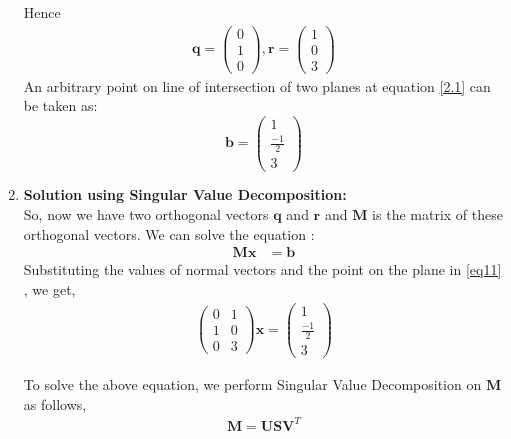 \documentclass[journal,12pt,twocolumn]{IEEEtran}
\let\vec\mathbf
\numberwithin{equation}{subsection}
\newcommand{\myvec}[1]{\ensuremath{\begin{pmatrix}#1\end{pmatrix}}}
\begin{document}
\begin{enumerate}
Hence 
\begin{align}
\vec{q} = \myvec{0\\1\\0}, \vec{r} = \myvec{1\\0\\3}
\end{align}
An arbitrary point on line of intersection of two planes at equation \eqref{2.1} can be taken as:
\begin{equation}
	\vec{b} = \myvec{1 \\ \frac{-1}{2} \\ 3} \label{2.28}
\end{equation}
\item \textbf{Solution using Singular Value Decomposition:}\\
So, now we have two orthogonal vectors $\vec{q}$ and $\vec{r}$ and $\vec{M}$ is the matrix of these orthogonal vectors. We  can solve the equation :
\begin{align}
\vec{M}\vec{x} &= \vec{b}\label{eq11} 
\end{align}
Substituting the values of normal vectors and the point on the plane in \eqref{eq11} , we get,
\begin{align}
 \myvec{0 &1\\1 & 0\\0 & 3} \vec{x} = 	 \myvec{1 \\ \frac{-1}{2} \\ 3}
 \end{align}

To solve the above equation, we  perform Singular Value Decomposition on $\vec{M}$ as follows,
\begin{align}
\vec{M}=\vec{U}\vec{S}\vec{V}^T \label{2.20}
\end{align}


\end{enumerate}
\end{document}

